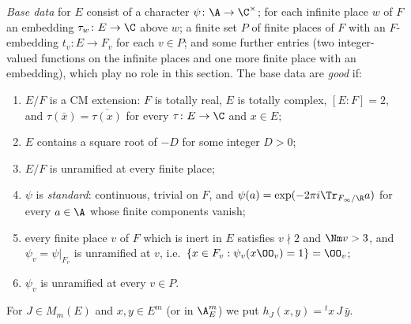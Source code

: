 \begin{definition}\label{pf:tlift:good}
\emph{Base data} for $E$ consist of a character $\psi\colon\A\to\C^\times$; for each infinite place $w$ of
$F$ an embedding $\tau_w\colon E\to\C$ above $w$; a finite set $P$ of finite places of $F$ with an
$F$-embedding $t_v\colon E\to F_v$ for each $v\in P$; and some further entries (two integer-valued
functions on the infinite places and one more finite place with an embedding), which play no role in
this section. The base data are \emph{good} if:
\begin{enumerate}[label=(G\arabic*),nosep]
\item $E/F$ is a CM extension: $F$ is totally real, $E$ is totally complex, $[E:F]=2$, and
  $\tau(\bar x)=\overline{\tau(x)}$ for every $\tau\colon E\to\C$ and $x\in E$;
\item $E$ contains a square root of $-D$ for some integer $D>0$;
\item $E/F$ is unramified at every finite place;
\item $\psi$ is \emph{standard}: continuous, trivial on $F$, and $\psi(a)=\exp(-2\pi i\Tr_{F_\infty/\R}a)$
  for every $a\in\A$ whose finite components vanish;
\item every finite place $v$ of $F$ which is inert in $E$ satisfies $v\nmid2$ and $\Nm v>3$, and
  $\psi_v=\psi|_{F_v}$ is unramified at $v$, i.e.\ $\{x\in F_v:\psi_v(x\OO_v)=1\}=\OO_v$;
\item $\psi_v$ is unramified at every $v\in P$.
\end{enumerate}
\end{definition}

For $J\in M_m(E)$ and $x,y\in E^m$ (or in $\tliftAE^m$) we put $h_J(x,y)={}^tx\,J\,\bar y$.

